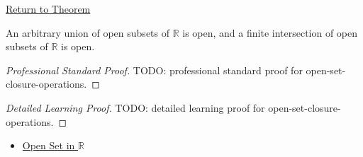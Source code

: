 \newpage
{}
\label{prf:open-set-closure-operations}

\begin{remark*}[Return]
\hyperref[thm:open-set-closure-operations]{Return to Theorem}
\end{remark*}

\begin{theorem*}
An arbitrary union of open subsets of $\mathbb{R}$ is open, and a finite intersection of open subsets of $\mathbb{R}$ is open.
\end{theorem*}

\begin{proof}[Professional Standard Proof]
\LRAProofBodyStart
TODO: professional standard proof for open-set-closure-operations.
\end{proof}

\begin{proof}[Detailed Learning Proof]
\LRAProofBodyStart
TODO: detailed learning proof for open-set-closure-operations.
\end{proof}

\begin{remark*}
\end{remark*}

\begin{dependencies}
\begin{itemize}
  \item \hyperref[def:open-set]{Open Set in $\mathbb{R}$}
\end{itemize}
\end{dependencies}

\clearpage
